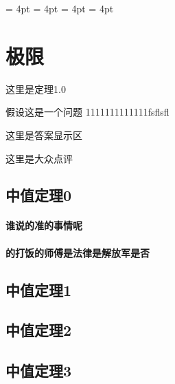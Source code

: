 \documentclass[no-math]{lecture}
\begin{document}
	\raggedbottom
	\abovedisplayshortskip = 4pt
	\belowdisplayshortskip = 4pt
	\abovedisplayskip 		 = 4pt
	\belowdisplayskip 		 = 4pt
	\frontmatter
		\tableofcontents
	\mainmatter
\newpage
	\chapter{极限}
	\begin{Theorems}
	这里是定理1.0
	\end{Theorems}
	假设这是一个问题	1111111111111fsflsfl
\begin{PROBLEMANSWERS}
	\begin{Analysis}{34}
		这里是答案显示区
	\end{Analysis}


	\begin{Assess}
		这里是大众点评
	\end{Assess}
\end{PROBLEMANSWERS}
	


	\section{中值定理0}
		\subsubsection{谁说的准的事情呢}
		\subsubsection{的打饭的师傅是法律是解放军是否}
	\section{中值定理1}
	\section{中值定理2}
	\section{中值定理3}
\end{document}

